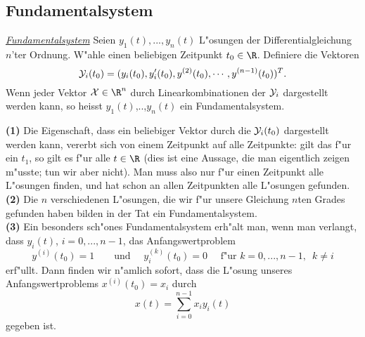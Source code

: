 \subsection{Fundamentalsystem}
\begin{sdefi}
{\it \underline{Fundamentalsystem} } 
Seien $y_1(t),...,y_n(t)$ L"osungen der Differentialgleichung $n$'ter Ordnung.  
W"ahle einen beliebigen Zeitpunkt $t_0\in\R$. Definiere die Vektoren
$$ {\cal Y}_i(t_0) = (y_i(t_0), y'_i(t_0), y^{(2)}(t_0),\cdots, y^{(n-1)}(t_0))^T.$$
Wenn jeder Vektor ${\cal X}\in\R^n$ durch Linearkombinationen der ${\cal Y}_i$ 
dargestellt werden kann, so heisst $y_1(t)$,..,$y_n(t)$ ein Fundamentalsystem. 
\end{sdefi}
\begin{sbem}
{\bf (1)} Die Eigenschaft, dass ein beliebiger Vektor durch die ${\cal Y}_i(t_0)$ 
dargestellt werden kann, vererbt sich von einem Zeitpunkt auf alle Zeitpunkte: 
gilt das f"ur ein $t_1$, so gilt es f"ur alle $t\in\R$ (dies ist eine Aussage, 
die man eigentlich zeigen m"usste; tun wir aber nicht). Man muss also nur f"ur 
einen Zeitpunkt alle L"osungen finden, und hat schon an allen Zeitpunkten alle 
L"osungen gefunden.\\
{\bf (2)} Die $n$ verschiedenen L"osungen, die wir f"ur unsere Gleichung $n$ten Grades gefunden haben bilden in der
Tat ein Fundamentalsystem.\\
{\bf (3)} Ein besonders sch"ones Fundamentalsystem erh"alt man, wenn man verlangt, 
dass  $y_i(t)$, $i=0,...,n-1$, das Anfangswertproblem
$$  y^{(i)}(t_0) = 1
\qquad \mbox{und }
\quad
y_i^{(k)}(t_0) = 0\quad\mbox{ f"ur }k=0,...,n-1,\,\,\, k\not=i$$
erf"ullt. Dann finden wir n"amlich sofort, dass die L"osung unseres Anfangswertproblems 
$x^{(i)}(t_0) = x_i$ durch $$ x(t) = \sum_{i=0}^{n-1} x_i y_i(t)$$
gegeben ist.\end{sbem}
\par\bigskip
